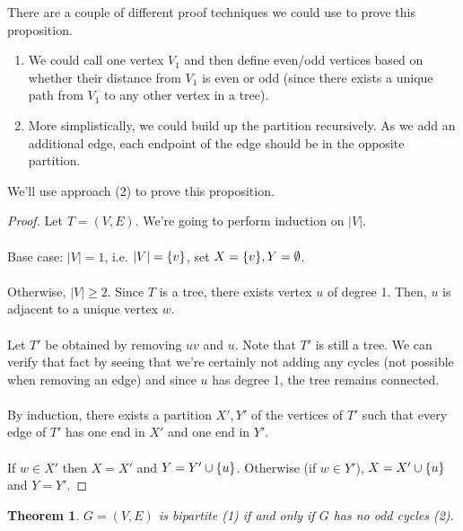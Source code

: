 \documentclass[]{article}
\newtheorem*{theorem}{Theorem}
\theoremstyle{definition}
\DeclarePairedDelimiter{\set}{\lbrace}{\rbrace}
\begin{document}
			There are a couple of different proof techniques we could use to prove this proposition.
			\begin{enumerate}
				\item We could call one vertex $V_1$ and then define even/odd vertices based on whether their distance from $V_1$ is even or odd (since there exists a unique path from $V_1$ to any other vertex in a tree). 
				\item More simplistically, we could build up the partition recursively. As we add an additional edge, each endpoint of the edge should be in the opposite partition.
			\end{enumerate}

			We'll use approach (2) to prove this proposition.
			\begin{proof}
				Let $T = (V, E)$. We're going to perform induction on $|V|$.
				\\ \\
				Base case: $|V| = 1$, i.e. $|V| = \set{v}$, set $X = \set{v}, Y = \emptyset$.
				\\ \\
				Otherwise, $|V| \ge 2$. Since $T$ is a tree, there exists vertex $u$ of degree 1. Then, $u$ is adjacent to a unique vertex $w$.
				\\ \\
				Let $T'$ be obtained by removing $uv$ and $u$. Note that $T'$ is still a tree. We can verify that fact by seeing that we're certainly not adding any cycles (not possible when removing an edge) and since $u$ has degree 1, the tree remains connected.
				\\ \\
				By induction, there exists a partition $X', Y'$ of the vertices of $T'$ such that every edge of $T'$ has one end in $X'$ and one end in $Y'$.
				\\ \\
				If $w \in X'$ then $X = X'$ and $Y = Y' \cup \set{u}$. Otherwise (if $w \in Y'$), $X = X' \cup \set{u}$ and $Y = Y'$.
			\end{proof}

			\begin{theorem}
				$G = (V, E)$ is bipartite (1) if and only if $G$ has no odd cycles (2).
			\end{theorem}
\end{document}
